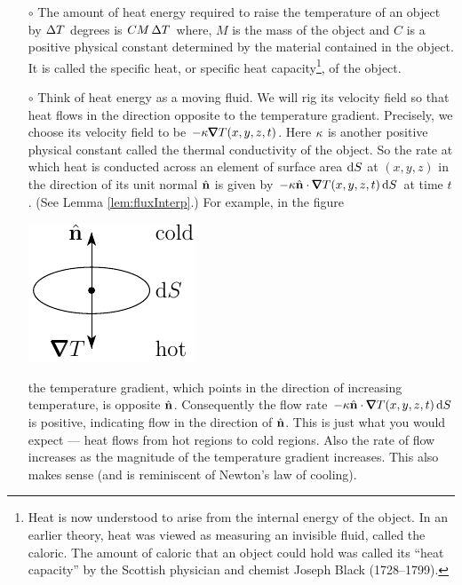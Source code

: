 \begin{itemize}\itemsep1pt \parskip0pt  %
\item[$\circ$] 
The amount of heat energy required to raise the temperature
of an object by $\Delta T$ degrees is $CM\,\Delta T$ where, $M$ is the mass 
of the object and $C$ is a positive physical constant determined by the 
material contained in the object. It is called the specific heat, or specific heat capacity\footnote{
Heat is now understood to arise from the internal energy of the object.
In an earlier theory, heat was viewed as measuring an invisible fluid, 
called the caloric. The amount of caloric that an object could hold 
was called its ``heat capacity'' by the Scottish physician and chemist 
Joseph Black (1728--1799).}, of the object.
\item[$\circ$]
Think of heat energy as a moving fluid. We will rig its velocity field so
that heat flows in the direction opposite to the temperature gradient.
Precisely, we choose its velocity field to be $-\ka\vnabla T(x,y,z,t)$. 
Here $\kappa$ is another positive physical constant called the thermal 
conductivity of the object. So the rate at which heat is conducted
across an element of surface area $\mathrm{d}S$ at $(x,y,z)$ in the direction of 
its unit normal $\hat{\mathbf{n}}$ is given by $-\ka\hn\cdot\vnabla T(x,y,z,t)\,\dee{S}$ at 
time $t$. (See Lemma \ref{lem:fluxInterp}.) For example, in the figure
\begin{nfig}
\begin{center}
    \includegraphics{heat1.pdf}
\end{center}
\end{nfig}
the temperature gradient, which points in the direction of 
increasing temperature, is opposite $\hat{\mathbf{n}}$. Consequently the flow rate 
$-\ka\hn\cdot\vnabla T(x,y,z,t)\,\dee{S}$ is positive, indicating flow in the 
direction of $\hat{\mathbf{n}}$. This is just what you would expect --- heat flows from
hot regions to cold regions. Also the rate of flow increases as the 
magnitude of the temperature gradient increases. This also makes sense
(and is reminiscent of Newton's law of cooling).
\end{itemize}
